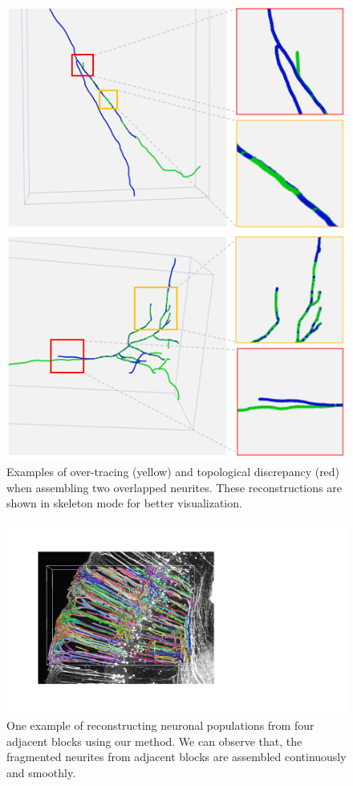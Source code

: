\begin{figure}[th]
	\centering
	\includegraphics[width=1\columnwidth]{./Illustrations/neuorns_fusion5.png}
	\caption{Examples of over-tracing (yellow) and topological discrepancy (red) when assembling two overlapped neurites. These reconstructions are shown in skeleton mode for better visualization.}
	\label{fig:overlap_discrepancy}
\end{figure}

\begin{figure}[t]
	\centering
	\includegraphics[width=1\columnwidth]{./Illustrations/trace_four_blocks2.pdf}
	\caption{One example of reconstructing neuronal populations from four adjacent blocks using our method. We can observe that, the fragmented neurites from adjacent blocks are assembled continuously and smoothly.}
	\label{fig:reconstruct_blocks}
\end{figure}


